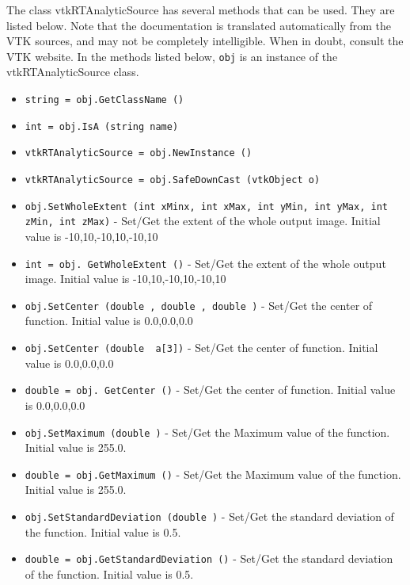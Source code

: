 The class vtkRTAnalyticSource has several methods that can be used.
  They are listed below.
Note that the documentation is translated automatically from the VTK sources,
and may not be completely intelligible.  When in doubt, consult the VTK website.
In the methods listed below, \verb|obj| is an instance of the vtkRTAnalyticSource class.
\begin{itemize}
\item  \verb|string = obj.GetClassName ()|

\item  \verb|int = obj.IsA (string name)|

\item  \verb|vtkRTAnalyticSource = obj.NewInstance ()|

\item  \verb|vtkRTAnalyticSource = obj.SafeDownCast (vtkObject o)|

\item  \verb|obj.SetWholeExtent (int xMinx, int xMax, int yMin, int yMax, int zMin, int zMax)| -  Set/Get the extent of the whole output image. Initial value is
 {-10,10,-10,10,-10,10}

\item  \verb|int = obj. GetWholeExtent ()| -  Set/Get the extent of the whole output image. Initial value is
 {-10,10,-10,10,-10,10}

\item  \verb|obj.SetCenter (double , double , double )| -  Set/Get the center of function. Initial value is {0.0,0.0,0.0}

\item  \verb|obj.SetCenter (double  a[3])| -  Set/Get the center of function. Initial value is {0.0,0.0,0.0}

\item  \verb|double = obj. GetCenter ()| -  Set/Get the center of function. Initial value is {0.0,0.0,0.0}

\item  \verb|obj.SetMaximum (double )| -  Set/Get the Maximum value of the function. Initial value is 255.0.

\item  \verb|double = obj.GetMaximum ()| -  Set/Get the Maximum value of the function. Initial value is 255.0.

\item  \verb|obj.SetStandardDeviation (double )| -  Set/Get the standard deviation of the function. Initial value is 0.5.

\item  \verb|double = obj.GetStandardDeviation ()| -  Set/Get the standard deviation of the function. Initial value is 0.5.


\end{itemize}
